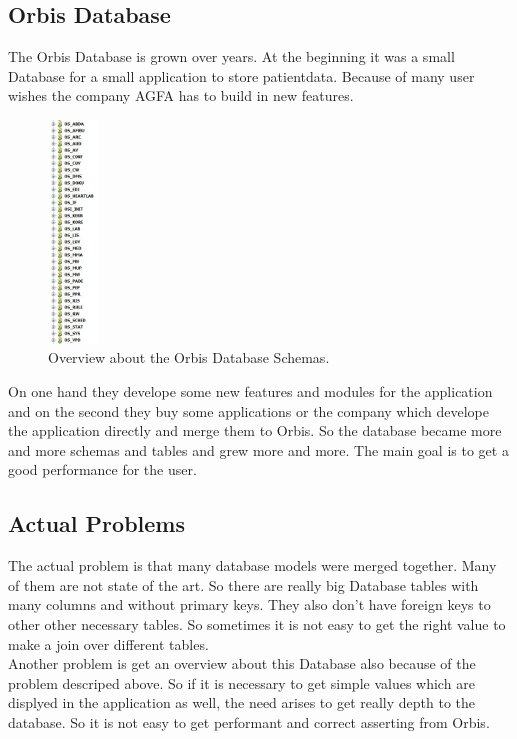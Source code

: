 \documentclass[a4paper]{article}
\begin{document}
	\subsection{Orbis Database}
	The Orbis Database is grown over years. At the beginning it was a small
	Database for a small application to store patientdata. Because of many user
	wishes the company AGFA has to build in new features. \\
	\begin{figure}[!ht]
		  \centering
		      \includegraphics[width=0.12\textwidth]{orbis_db_schema}
		  \caption{Overview about the Orbis Database Schemas.}
	\end{figure}
	On one hand they develope some new features and modules for the application and
	on the second they buy some applications or the company which develope the application directly and
	merge them to Orbis. So the database became more and more schemas and tables
	and grew more and more. The main goal is to get a good performance for the
	user.
	\subsection{Actual Problems}
	The actual problem is that many database models were merged together. Many of
	them are not state of the art. So there are really big Database tables with
	many columns and without primary keys. They also don't have foreign keys to
	other other necessary tables. So sometimes it is not easy to get the right
	value to make a join over different tables.\\
	Another problem is get an overview about this Database also because of the
	problem descriped above. So if it is necessary to get simple values
	which are displyed in the application as well, the need arises to get really
	depth to the database. So it is not easy to get performant and correct
	asserting from Orbis.
\end{document}

